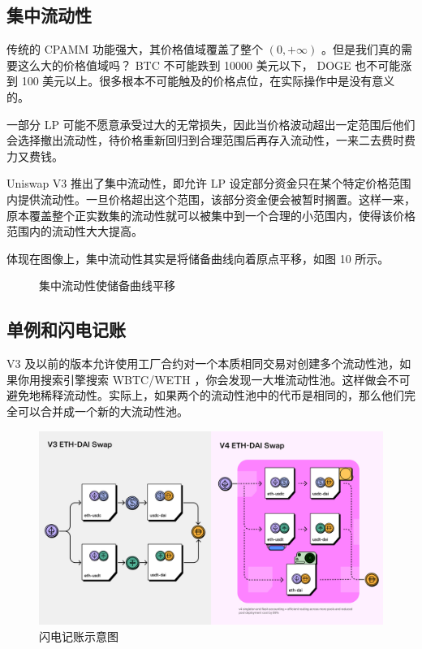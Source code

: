 \documentclass[12pt, a4paper, oneside]{ctexart}
\begin{document}
\subsection{集中流动性}

传统的 CPAMM 功能强大，其价格值域覆盖了整个 $(0,+\infty)$ 。但是我们真的需要这么大的价格值域吗？ BTC 不可能跌到 10000 美元以下， DOGE 也不可能涨到 100 美元以上。很多根本不可能触及的价格点位，在实际操作中是没有意义的。

一部分 LP 可能不愿意承受过大的无常损失，因此当价格波动超出一定范围后他们会选择撤出流动性，待价格重新回归到合理范围后再存入流动性，一来二去费时费力又费钱。

Uniswap V3 推出了集中流动性，即允许 LP 设定部分资金只在某个特定价格范围内提供流动性。一旦价格超出这个范围，该部分资金便会被暂时搁置。这样一来，原本覆盖整个正实数集的流动性就可以被集中到一个合理的小范围内，使得该价格范围内的流动性大大提高。

体现在图像上，集中流动性其实是将储备曲线向着原点平移，如图 10 所示。

\begin{figure}
    \centering
    \caption{集中流动性使储备曲线平移}
\end{figure}

\subsection{单例和闪电记账}

V3 及以前的版本允许使用工厂合约对一个本质相同交易对创建多个流动性池，如果你用搜索引擎搜索 WBTC/WETH ，你会发现一大堆流动性池。这样做会不可避免地稀释流动性。实际上，如果两个的流动性池中的代币是相同的，那么他们完全可以合并成一个新的大流动性池。

\begin{figure}[htbp]
    \centering
    \includegraphics*[width=12cm]{闪电记账示意图.jpg}
    \caption{闪电记账示意图}
\end{figure}
\end{document}
